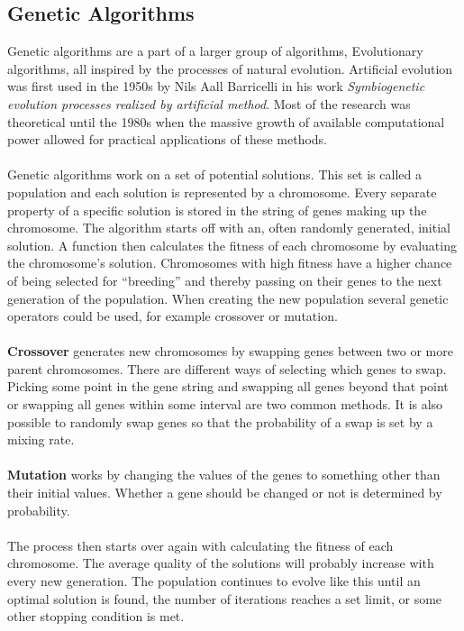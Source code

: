\documentclass[titlepage,a4paper]{article}
\begin{document}
\subsection{Genetic Algorithms}
Genetic algorithms are a part of a larger group of algorithms, Evolutionary algorithms, all inspired by the processes of natural evolution. Artificial evolution was first used in the 1950s by Nils Aall Barricelli in his work \emph{Symbiogenetic evolution processes realized by artificial method}. Most of the research was theoretical until the 1980s when the massive growth of available computational power allowed for practical applications of these methods. \\\\
Genetic algorithms work on a set of potential solutions. This set is called a population and each solution is represented by a chromosome. Every separate property of a specific solution is stored in the string of genes making up the chromosome. The algorithm starts off with an, often randomly generated, initial solution. A function then calculates the fitness of each chromosome by evaluating the chromosome’s solution. Chromosomes with high fitness have a higher chance of being selected for “breeding” and thereby passing on their genes to the next generation of the population. When creating the new population several genetic operators could be used, for example crossover or mutation.  \\\\
\textbf{Crossover} generates new chromosomes by swapping genes between two or more parent chromosomes. There are different ways of selecting which genes to swap. Picking some point in the gene string and swapping all genes beyond that point or swapping all genes within some interval are two common methods. It is also possible to randomly swap genes so that the probability of a swap is set by a mixing rate. \\\\
\textbf{Mutation} works by changing the values of the genes to something other than their initial values. Whether a gene should be changed or not is determined by probability\cite{anApp05}. \\\\
The process then starts over again with calculating the fitness of each chromosome. The average quality of the solutions will probably increase with every new generation. The population continues to evolve like this until an optimal solution is found, the number of iterations reaches a set limit, or some other stopping condition is met. \\\\
\end{document}
